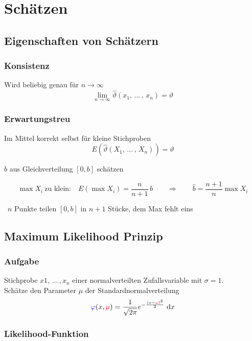 \section{Schätzen}

\subsection{Eigenschaften von Schätzern}

\subsubsection{Konsistenz}

Wird beliebig genau für $n \to \infty$
$$ \lim\limits_{n \to \infty} \hat{\vartheta}(x_1, \, \ldots \, , \, x_n) = \vartheta $$


\subsubsection{Erwartungstreu}

Im Mittel korrekt selbst für kleine Stichproben
$$ E (\hat{\vartheta}(X_1, \, ... \, , \, X_n) ) = \vartheta $$

 $b$ aus Gleichverteilung $[0, b]$ schätzen

$$ \max X_i \ \text{zu klein:} \quad E(\max X_i) = \frac{n}{n+1}\, b \qquad \Rightarrow \qquad \boxed{ \hat{b} = \frac{n+1}{n} \max X_i } $$

{\small \textrightarrow\ $n$ Punkte teilen $[0, b]$ in $n+1$ Stücke, dem Max fehlt eins\par}


\subsection{Maximum Likelihood Prinzip}

\subsubsection{Aufgabe}

Stichprobe $x1, \, \ldots \, , x_n$ einer normalverteilten Zufallsvariable mit $\sigma = 1$. \\
Schätze den Parameter $\mu$ der Standardnormalverteilung
$$ {\color{blue}\varphi}(x, {\color{red}\mu}) = \frac{1}{ \sqrt{2 \pi}} e^{- \frac{(x - {\color{red}\mu})^2}{2}}  \, \mathop{} \! \mathrm{d} x $$


\subsubsection{Likelihood-Funktion}

